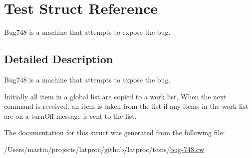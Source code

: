 \hypertarget{struct_test}{}\section{Test Struct Reference}
\label{struct_test}


Bug748 is a machine that attempts to expose the bug.  




\subsection{Detailed Description}
Bug748 is a machine that attempts to expose the bug. 

Initially all item in a global list are copied to a work list, When the next command is received, an item is taken from the list if any items in the work list are on a turn\+Off message is sent to the list. 

The documentation for this struct was generated from the following file\+:\begin{DoxyCompactItemize}
\item 
/\+Users/martin/projects/latproc/github/latproc/tests/\hyperlink{bug-748_8cw}{bug-\/748.\+cw}\end{DoxyCompactItemize}

